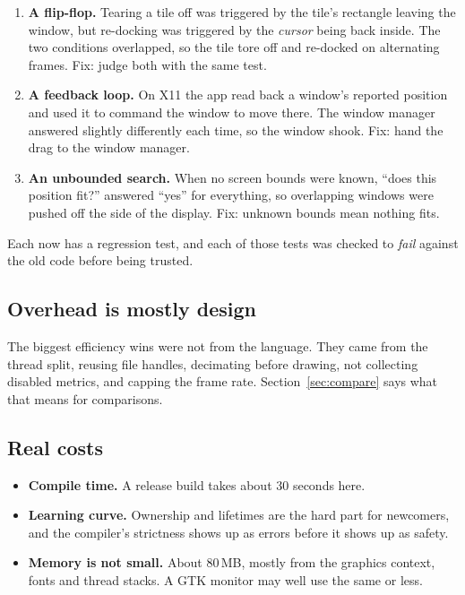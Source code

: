 \documentclass[11pt,a4paper]{article}
\begin{document}
\begin{enumerate}
  \item \textbf{A flip-flop.} Tearing a tile off was triggered by the tile's rectangle leaving
        the window, but re-docking was triggered by the \emph{cursor} being back inside. The
        two conditions overlapped, so the tile tore off and re-docked on alternating frames.
        Fix: judge both with the same test.
  \item \textbf{A feedback loop.} On X11 the app read back a window's reported position and
        used it to command the window to move there. The window manager answered slightly
        differently each time, so the window shook. Fix: hand the drag to the window manager.
  \item \textbf{An unbounded search.} When no screen bounds were known, ``does this position
        fit?'' answered ``yes'' for everything, so overlapping windows were pushed off the side
        of the display. Fix: unknown bounds mean nothing fits.
\end{enumerate}

Each now has a regression test, and each of those tests was checked to \emph{fail} against the
old code before being trusted.

\subsection{Overhead is mostly design}
The biggest efficiency wins were not from the language. They came from the thread split,
reusing file handles, decimating before drawing, not collecting disabled metrics, and
capping the frame rate. Section~\ref{sec:compare} says what that means for comparisons.

\subsection{Real costs}
\begin{itemize}
  \item \textbf{Compile time.} A release build takes about 30 seconds here.
  \item \textbf{Learning curve.} Ownership and lifetimes are the hard part for newcomers, and
        the compiler's strictness shows up as errors before it shows up as safety.
  \item \textbf{Memory is not small.} About 80\,MB, mostly from the graphics context, fonts
        and thread stacks. A GTK monitor may well use the same or less.
\end{itemize}
\end{document}
